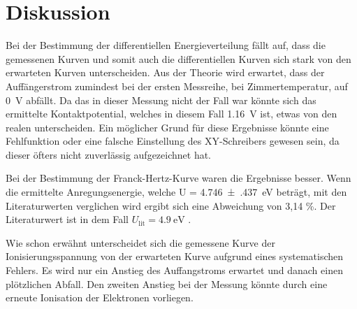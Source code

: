 \section{Diskussion}

Bei der Bestimmung der differentiellen Energieverteilung fällt auf, dass die gemessenen
Kurven und somit auch die differentiellen Kurven sich stark von den erwarteten
Kurven unterscheiden. Aus der Theorie wird erwartet, dass der Auffängerstrom zumindest
bei der ersten Messreihe, bei Zimmertemperatur, auf \SI{0}{\volt} abfällt. Da das
in dieser Messung nicht der Fall war könnte sich das ermittelte Kontaktpotential,
welches in diesem Fall \SI{1.16}{\volt} ist, etwas von den realen unterscheiden.
Ein möglicher Grund für diese Ergebnisse könnte eine Fehlfunktion oder eine falsche
Einstellung des XY-Schreibers gewesen sein, da dieser öfters nicht zuverlässig
aufgezeichnet hat.

Bei der Bestimmung der Franck-Hertz-Kurve waren die Ergebnisse besser. Wenn die
ermittelte Anregungsenergie, welche U = \SI{4.746(437)}{\electronvolt} beträgt, mit den
Literaturwerten verglichen wird ergibt sich eine Abweichung von 3,14 \%.
Der Literaturwert ist in dem Fall $U_\text{lit} = \SI{4.9}{\electronvolt}$ \cite{2}.

Wie schon erwähnt unterscheidet sich die gemessene Kurve der Ionisierungsspannung
von der erwarteten Kurve aufgrund eines systematischen Fehlers. Es wird nur ein
Anstieg des Auffangstroms erwartet und danach einen plötzlichen Abfall. Den zweiten
Anstieg bei der Messung könnte durch eine erneute Ionisation der Elektronen vorliegen.

